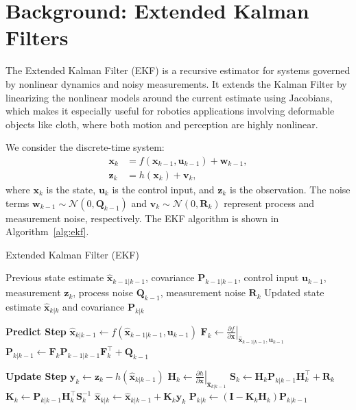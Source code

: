 \section{Background: Extended Kalman Filters}

The Extended Kalman Filter (EKF) is a recursive estimator for systems governed by nonlinear dynamics and noisy measurements. It extends the Kalman Filter by linearizing the nonlinear models around the current estimate using Jacobians, which makes it especially useful for robotics applications involving deformable objects like cloth, where both motion and perception are highly nonlinear.

We consider the discrete-time system:
\begin{align}
    \mathbf{x}_{k} &= f(\mathbf{x}_{k-1}, \mathbf{u}_{k-1}) + \mathbf{w}_{k-1}, \\
    \mathbf{z}_{k} &= h(\mathbf{x}_{k}) + \mathbf{v}_{k},
\end{align}
where $\mathbf{x}_k$ is the state, $\mathbf{u}_k$ is the control input, and $\mathbf{z}_k$ is the observation. The noise terms $\mathbf{w}_{k-1} \sim \mathcal{N}(0, \mathbf{Q}_{k-1})$ and $\mathbf{v}_k \sim \mathcal{N}(0, \mathbf{R}_k)$ represent process and measurement noise, respectively. The EKF algorithm is shown in Algorithm~\ref{alg:ekf}.
\begin{algorithm}[H]
\caption{Extended Kalman Filter (EKF)}\label{alg:ekf}
\begin{algorithmic}[1]
\Require Previous state estimate $\hat{\mathbf{x}}_{k-1|k-1}$, covariance $\mathbf{P}_{k-1|k-1}$, control input $\mathbf{u}_{k-1}$, measurement $\mathbf{z}_k$, process noise $\mathbf{Q}_{k-1}$, measurement noise $\mathbf{R}_k$
\Ensure Updated state estimate $\hat{\mathbf{x}}_{k|k}$ and covariance $\mathbf{P}_{k|k}$

\Statex \textbf{Predict Step}
\State $\hat{\mathbf{x}}_{k|k-1} \gets f(\hat{\mathbf{x}}_{k-1|k-1}, \mathbf{u}_{k-1})$ 
\State $\mathbf{F}_k \gets \left. \frac{\partial f}{\partial \mathbf{x}} \right|_{\hat{\mathbf{x}}_{k-1|k-1}, \mathbf{u}_{k-1}}$ 
\State $\mathbf{P}_{k|k-1} \gets \mathbf{F}_k \mathbf{P}_{k-1|k-1} \mathbf{F}_k^\top + \mathbf{Q}_{k-1}$ 

\Statex \textbf{Update Step}
\State $\mathbf{y}_k \gets \mathbf{z}_k - h(\hat{\mathbf{x}}_{k|k-1})$ 
\State $\mathbf{H}_k \gets \left. \frac{\partial h}{\partial \mathbf{x}} \right|_{\hat{\mathbf{x}}_{k|k-1}}$ 
\State $\mathbf{S}_k \gets \mathbf{H}_k \mathbf{P}_{k|k-1} \mathbf{H}_k^\top + \mathbf{R}_k$ 
\State $\mathbf{K}_k \gets \mathbf{P}_{k|k-1} \mathbf{H}_k^\top \mathbf{S}_k^{-1}$ 
\State $\hat{\mathbf{x}}_{k|k} \gets \hat{\mathbf{x}}_{k|k-1} + \mathbf{K}_k \mathbf{y}_k$ 
\State $\mathbf{P}_{k|k} \gets (\mathbf{I} - \mathbf{K}_k \mathbf{H}_k) \mathbf{P}_{k|k-1}$ 
\end{algorithmic}
\end{algorithm}

